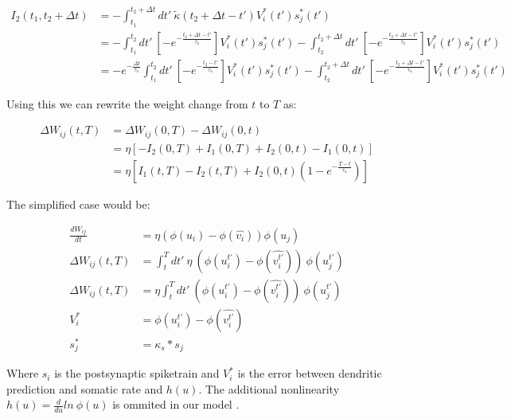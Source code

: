 \begin{align}
  I_2 (t_1, t_2 + \Delta t) & = -\int_{t_1}^{t_2 + \Delta t} dt' \ \tilde{\kappa} (t_2 + \Delta t - t') V_i^\ast (t') s_j^\ast (t')                                        \\
                            & = -\int_{t_1}^{t_2} dt' \ \left[ -e^{- \frac{t_2 + \Delta t - t'}{\tau_\kappa}} \right] V_i^\ast (t') s_j^\ast (t')
  -\int_{t_2}^{t_2 + \Delta t} dt' \ \left[ -e^{- \frac{t_2 + \Delta t - t'}{\tau_\kappa}} \right] V_i^\ast (t') s_j^\ast (t')                                             \\
                            & = -e^{- \frac{ \Delta t}{\tau_\kappa}} \int_{t_1}^{t_2} dt' \ \left[ -e^{- \frac{t_2 - t'}{\tau_\kappa}} \right] V_i^\ast (t') s_j^\ast (t')
  -\int_{t_2}^{t_2 + \Delta t} dt' \ \left[ -e^{- \frac{t_2 + \Delta t - t'}{\tau_\kappa}} \right] V_i^\ast (t') s_j^\ast (t')
\end{align}


Using this we can rewrite the weight change from $t$ to $T$ as:


\begin{align}
  \Delta W_{ij}(t,T) & = \Delta W_{ij}(0,T) - \Delta W_{ij}(0,t)                                               \\
                     & = \eta [-I_2(0,T) + I_1(0,T) + I_2(0,t) - I_1(0,t)]                                     \\
                     & = \eta [I_1(t,T) - I_2(t,T) + I_2(0,t)\left( 1 - e^{- \frac{T-t}{\tau_\kappa}} \right)]
\end{align}

The simplified \citep{sacramento2018dendritic} case would be:

\begin{align}
  \frac{dW_{ij}}{dt} & = \eta (\phi(u_i) - \phi(\hat{v_i})) \phi(u_j)                                         \\
  \Delta W_{ij}(t,T) & = \int_t^T dt' \ \eta \  (\phi(u_i^{t'}) - \phi(\widehat{v_i^{t'}})) \  \phi(u_j^{t'}) \\
  \Delta W_{ij}(t,T) & = \eta \int_t^T dt' \  (\phi(u_i^{t'}) - \phi(\widehat{v_i^{t'}})) \ \phi(u_j^{t'})    \\
  V_i^*              & = \phi(u_i^{t'}) - \phi(\widehat{v_i^{t'}})                                            \\
  s_j^*              & = \kappa_s * s_j
\end{align}


Where $s_i$ is the postsynaptic spiketrain and $V_i^*$ is the error between dendritic prediction and somatic rate and
$h( u )$. The additional nonlinearity $h( u ) = \frac{d}{du} ln \  \phi(u)$ is ommited in our model .




